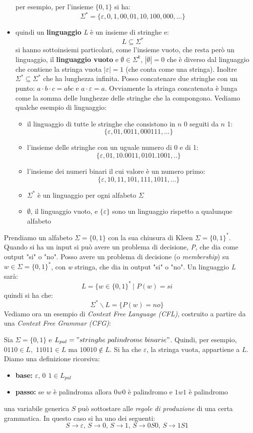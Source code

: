 \documentclass[a4paper,12pt, oneside]{book}
\begin{document}
\begin{itemize}
	      per esempio, per l'insieme $\{0,1\}$ si ha:
	      $$\Sigma^*=\{\varepsilon,0,1,00,01,10,100,000,...\}$$
	\item quindi un \textbf{linguaggio} \textit{L} è un insieme di stringhe e:
	      $$L\subseteq \Sigma^*$$
	      si hanno sottoinsiemi particolari, come l'insieme vuoto, che resta però un linguaggio, il \textbf{linguaggio vuoto} e $\emptyset\in\Sigma^k,\,|\emptyset|=0$ che è diverso dal linguaggio che contiene la stringa vuota $|\varepsilon|=1$ (che conta come una stringa). Inoltre $\Sigma^*\subseteq \Sigma^*$ che ha lunghezza infinita. Posso concatenare due stringhe con un punto: $a\cdot b\cdot c=abc$ e $a\cdot \varepsilon=a$. Ovviamente la stringa concatenata è lunga come la somma delle lunghezze delle stringhe che la compongono. Vediamo qualche esempio di linguaggio:
	      \begin{itemize}
		      \item il linguaggio di tutte le stringhe che consistono in $n$ 0 seguiti da $n$ 1:
		            $$\{\varepsilon,01,0011,000111,...\}$$
		      \item l'insieme delle stringhe con un uguale numero di 0 e di 1:
		            $$\{\varepsilon,01,10.0011,0101.1001,..\}$$
		      \item l'insieme dei numeri binari il cui valore è un numero primo:
		            $$\{\varepsilon,10 , 11, 101, 111,1011,...\}$$
		      \item $\Sigma^*$ è un linguaggio per ogni alfabeto $\Sigma$
		      \item $\emptyset$, il linguaggio vuoto, e $\{\varepsilon\}$ sono un linguaggio rispetto a qualunque alfabeto
	      \end{itemize}
\end{itemize}
Prendiamo un alfabeto $\Sigma=\{0, 1\}$ con la sua chiusura di Kleen $\Sigma=\{0, 1\}^*$. Quando si ha un input si può avere un problema di decisione, \textit{P}, che dia come output "si" o "no". Posso avere un problema di decisione (o \textit{membership}) su $w\in\Sigma=\{0, 1\}^*$, con \textit{w} stringa, che dia in output "si" o "no". Un linguaggio \textit{L} sarà:
$$L=\{w\in\{0, 1\}^*\,|\,\, P(w)=si$$
quindi si ha che:
$$\Sigma^*\backslash L=\{P(w)=no\}$$
Vediamo ora un esempio di \textit{Context Free Language (CFL)}, costruito a partire da una \textit{Context Free Grammar (CFG)}:
\begin{esempio}
	Sia $\Sigma=\{0, 1\}$ e $L_{pal}="stringhe\,\, palindrome\,\, binarie"$.
	Quindi, per esempio, $0110\in L,\,\, 11011\in L$ ma $10010\not\in L$. Si ha che $\varepsilon$, la stringa vuota, appartiene a $L$. Diamo una definizione ricorsiva:
	\begin{itemize}
		\item \textbf{base:} $\varepsilon,\, 0\,\ 1\in L_{pal}$
		\item \textbf{passo:} se $w$ è palindroma allora $0w0$ è palindromo e $1w1$ è palindromo
	\end{itemize}
	una variabile generica $S$ può sottostare alle \textit{regole di produzione} di una certa grammatica. In questo caso si ha uno dei seguenti:
	$$S\to\varepsilon,\, S\to 0,\, S\to 1,\, S\to 0S0,\, S\to 1S1$$
\end{esempio}
\end{document}
